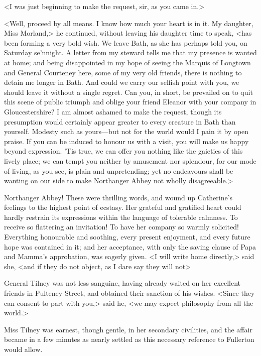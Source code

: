  <I was just beginning to make the request, sir, as you came in.> 

 <Well, proceed by all means. I know how much your heart is in it. My daughter, Miss Morland,> he continued, without leaving his daughter time to speak, <has been forming a very bold wish. We leave Bath, as she has perhaps told you, on Saturday se'nnight. A letter from my steward tells me that my presence is wanted at home; and being disappointed in my hope of seeing the Marquis of Longtown and General Courteney here, some of my very old friends, there is nothing to detain me longer in Bath. And could we carry our selfish point with you, we should leave it without a single regret. Can you, in short, be prevailed on to quit this scene of public triumph and oblige your friend Eleanor with your company in Gloucestershire? I am almost ashamed to make the request, though its presumption would certainly appear greater to every creature in Bath than yourself. Modesty such as yours—but not for the world would I pain it by open praise. If you can be induced to honour us with a visit, you will make us happy beyond expression. 'Tis true, we can offer you nothing like the gaieties of this lively place; we can tempt you neither by amusement nor splendour, for our mode of living, as you see, is plain and unpretending; yet no endeavours shall be wanting on our side to make Northanger Abbey not wholly disagreeable.> 

 Northanger Abbey! These were thrilling words, and wound up Catherine's feelings to the highest point of ecstasy. Her grateful and gratified heart could hardly restrain its expressions within the language of tolerable calmness. To receive so flattering an invitation! To have her company so warmly solicited! Everything honourable and soothing, every present enjoyment, and every future hope was contained in it; and her acceptance, with only the saving clause of Papa and Mamma's approbation, was eagerly given. <I will write home directly,> said she, <and if they do not object, as I dare say they will not\longdash> 

 General Tilney was not less sanguine, having already waited on her excellent friends in Pulteney Street, and obtained their sanction of his wishes. <Since they can consent to part with you,> said he, <we may expect philosophy from all the world.> 

 Miss Tilney was earnest, though gentle, in her secondary civilities, and the affair became in a few minutes as nearly settled as this necessary reference to Fullerton would allow. 

